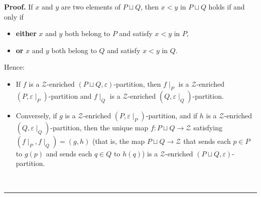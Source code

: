 \documentclass[numbers=enddot,12pt,final,onecolumn,notitlepage]{scrartcl}%
\theoremstyle{definition}
\newenvironment{proof}[1][Proof]{\noindent\textbf{#1.} }{\ \rule{0.5em}{0.5em}}
\newenvironment{verlong}{}{}
\begin{document}
\begin{proof}
\begin{verlong}
If $x$ and $y$ are two elements of $P \sqcup Q$, then $x < y$ in $P \sqcup Q$
holds if and only if
\begin{itemize}
\item \textbf{either} $x$ and $y$ both belong to $P$ and satisfy $x < y$ in $P$,
\item \textbf{or} $x$ and $y$ both belong to $Q$ and satisfy $x < y$ in $Q$.
\end{itemize}
Hence:
\begin{itemize}
\item If $f$ is a
$\mathcal{Z}$-enriched $\left(P \sqcup Q, \varepsilon\right)$-partition,
then $f \mid_P$ is a $\mathcal{Z}$-enriched
$\left(  P,\varepsilon\mid_P\right)$-partition and
$f \mid_Q$ is a $\mathcal{Z}$-enriched
$\left(  Q,\varepsilon\mid_Q\right)$-partition.
\item Conversely, if $g$ is a $\mathcal{Z}$-enriched
$\left(  P,\varepsilon\mid_P\right)$-partition, and if
$h$ is a $\mathcal{Z}$-enriched
$\left(  Q,\varepsilon\mid_Q\right)$-partition, then the unique map
$f : P \sqcup Q \to \mathcal{Z}$ satisfying
$\left(  f\mid_{P},f\mid_{Q}\right) = \left(g, h\right)$
(that is, the map $P \sqcup Q \to \mathcal{Z}$
that sends each $p \in P$ to $g \left( p \right)$
and sends each $q \in Q$ to $h \left( q \right)$) is
a $\mathcal{Z}$-enriched $\left(P \sqcup Q, \varepsilon\right)$-partition.
\end{itemize}
\end{verlong}


\end{proof}
\end{document}
